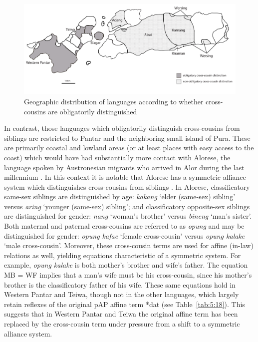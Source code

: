 \begin{figure}[t]
\includegraphics[width=\textwidth]{figures/Holton_ch5_fig15_grey.pdf}
\caption{Geographic distribution of languages according to whether  cross-cousins are obligatorily distinguished}
\label{fig_cross-cousin_map}
\label{fig:5:15}
\end{figure}  
 

In contrast, those languages which obligatorily distinguish cross-cousins from siblings are restricted to Pantar and the neighboring small island of Pura. These are primarily coastal and lowland areas (or at least places with easy access to the coast) which would have had substantially more contact with Alorese, the language spoken by Austronesian migrants who arrived in Alor during the last millennium \citep{Klamer2011}. In this context it is notable that Alorese has a symmetric alliance system which distinguishes cross-cousins from siblings \citep{Needham1956,Barnes1973}. In Alorese, classificatory same-sex siblings are distinguished by age: \textit{kakang} `elder (same-sex) sibling' versus \textit{aring} `younger (same-sex) sibling'; and classificatory opposite-sex siblings are distinguished for gender: \textit{nang} `woman's brother' versus \textit{bineng} `man's sister'. Both maternal and paternal cross-cousins are referred to as \textit{opung} and may be distinguished for gender: \textit{opung kafae} `female cross-cousin' versus \textit{opung kalake} `male cross-cousin'. Moreover, these cross-cousin terms are used for affine (in-law) relations as well, yielding equations characteristic of a symmetric system. For example, \textit{opung kalake} is both mother's brother and wife's father. The equation MB = WF implies that a man's wife must be his cross-cousin, since his mother's brother is the classificatory father of his wife. These same equations hold in Western Pantar and Teiwa, though not in the other languages, which largely retain reflexes of the original pAP affine term *dat (see Table~\ref{tab:5:18}). This suggests that in Western Pantar and Teiwa the original affine term has been replaced by the cross-cousin term under pressure from a shift to a symmetric alliance system. 



